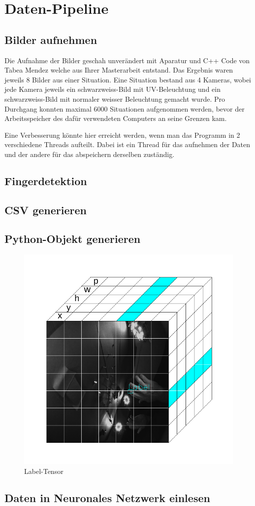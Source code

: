 \newpage
\section{Daten-Pipeline}
\subsection{Bilder aufnehmen}
Die Aufnahme der Bilder geschah unverändert mit Aparatur und C++ Code von Tabea Mendez welche aus Ihrer Masterarbeit entstand. 
Das Ergebnis waren jeweils 8 Bilder aus einer Situation. 
Eine Situation bestand aus 4 Kameras, wobei jede Kamera jeweils ein schwarzweiss-Bild mit UV-Beleuchtung und ein schwarzweiss-Bild mit normaler weisser Beleuchtung gemacht wurde. 
Pro Durchgang konnten maximal 6000 Situationen aufgenommen werden, bevor der Arbeitsspeicher des dafür verwendeten Computers an seine Grenzen kam. 

Eine Verbesserung könnte hier erreicht werden, wenn man das Programm in 2 verschiedene Threads aufteilt.
Dabei ist ein Thread für das aufnehmen der Daten und der andere für das abspeichern derselben zuständig.  
\subsection{Fingerdetektion}
\subsection{CSV generieren}
\subsection{Python-Objekt generieren}
\begin{figure}	
	\centering
	\includegraphics[width=.8\textwidth]{Kapitel/DatenPipeline/Bilder/LabelTensor.pdf}
	\caption{Label-Tensor}
	\label{img:label_tensor}
\end{figure} 
\subsection{Daten in Neuronales Netzwerk einlesen}

